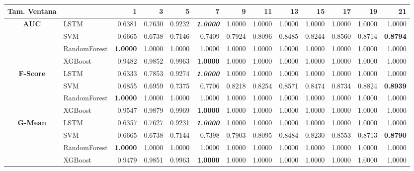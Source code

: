 \begin{table}[H]
	\centering
	\begin{adjustbox}{max width=14cm}
		\begin{tabular}{|c|l|r|r|r|r|r|r|r|r|r|r|r|}
			\hline
			\textbf{Tam. Ventana}&         &      1  &      3  &      5  &      7  &      9  &      11 &      13 &      15 &      17 &      19 &      21 \\
			\hline
			\textbf{AUC} &  LSTM &  0.6381 &  0.7630 &  0.9232 & \textit{ \textbf{  1.0000 } } &  1.0000 &  1.0000 &  1.0000 &  1.0000 &  1.0000 &  1.0000 &  1.0000 \\
			&  SVM &  0.6665 &  0.6738 &  0.7146 &  0.7409 &  0.7924 &  0.8096 &  0.8485 &  0.8244 &  0.8560 &  0.8714 & \textbf{  0.8794 } \\
			&  RandomForest & \textbf{  1.0000 } &  1.0000 &  1.0000 &  1.0000 &  1.0000 &  1.0000 &  1.0000 &  1.0000 &  1.0000 &  1.0000 &  1.0000 \\
			&  XGBoost &  0.9482 &  0.9852 &  0.9963 & \textbf{  1.0000 } &  1.0000 &  1.0000 &  1.0000 &  1.0000 &  1.0000 &  1.0000 &  1.0000 \\
			\hline
			\textbf{F-Score} &  LSTM &  0.6333 &  0.7853 &  0.9274 & \textit{ \textbf{  1.0000 } } &  1.0000 &  1.0000 &  1.0000 &  1.0000 &  1.0000 &  1.0000 &  1.0000 \\
			&  SVM &  0.6855 &  0.6959 &  0.7375 &  0.7706 &  0.8218 &  0.8254 &  0.8571 &  0.8474 &  0.8734 &  0.8824 & \textbf{  0.8939 } \\
			&  RandomForest & \textbf{  1.0000 } &  1.0000 &  1.0000 &  1.0000 &  1.0000 &  1.0000 &  1.0000 &  1.0000 &  1.0000 &  1.0000 &  1.0000 \\
			&  XGBoost &  0.9547 &  0.9879 &  0.9969 & \textbf{  1.0000 } &  1.0000 &  1.0000 &  1.0000 &  1.0000 &  1.0000 &  1.0000 &  1.0000 \\
			\hline
			\textbf{G-Mean} &  LSTM &  0.6357 &  0.7627 &  0.9231 & \textit{ \textbf{  1.0000 } } &  1.0000 &  1.0000 &  1.0000 &  1.0000 &  1.0000 &  1.0000 &  1.0000 \\
			&  SVM &  0.6665 &  0.6738 &  0.7144 &  0.7398 &  0.7903 &  0.8095 &  0.8484 &  0.8230 &  0.8553 &  0.8713 & \textbf{  0.8790 } \\
			&  RandomForest & \textbf{  1.0000 } &  1.0000 &  1.0000 &  1.0000 &  1.0000 &  1.0000 &  1.0000 &  1.0000 &  1.0000 &  1.0000 &  1.0000 \\
			&  XGBoost &  0.9479 &  0.9851 &  0.9963 & \textbf{  1.0000 } &  1.0000 &  1.0000 &  1.0000 &  1.0000 &  1.0000 &  1.0000 &  1.0000 \\

\end{tabular}
\end{adjustbox}
\end{table}
